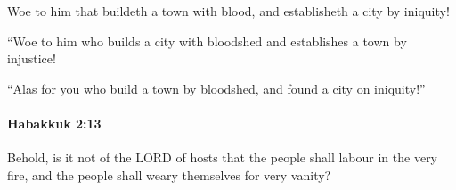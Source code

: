 			\begin{versebox}
					\item[BHS] 
					\item[LXX] 
					\item[ASV] Woe to him that buildeth a town with blood, and establisheth a city by iniquity!
					\item[NIV] “Woe to him who builds a city with bloodshed and establishes a town by injustice!
					\item[NRSV] “Alas for you who build a town by bloodshed, and found a city on iniquity!”
			\end{versebox}

		\paragraph{Habakkuk 2:13} %
			\label{HABAKKUK-2-13}

			Behold, is it not of the LORD of hosts that the people shall labour in the very fire, and the people shall weary themselves for very vanity?

